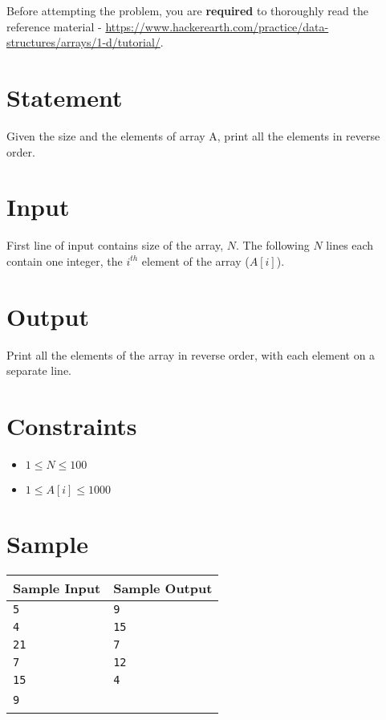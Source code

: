 \documentclass{article}
\begin{document}
Before attempting the problem, you are \textbf{required} to thoroughly read the reference material - \url{https://www.hackerearth.com/practice/data-structures/arrays/1-d/tutorial/}.

\section*{Statement}

Given the size and the elements of array A, print all the elements in reverse order.

\section*{Input}

First line of input contains size of the array, $N$. The following $N$ lines each contain one integer, the $i^{th}$ element of the array ($A[i]$).

\section*{Output}

Print all the elements of the array in reverse order, with each element on a separate line.

\section*{Constraints}

\begin{itemize}
    \item $1 \le N \le 100$
    \item $1 \le A[i] \le 1000$
\end{itemize}

\section*{Sample}

\begin{tabular}{l | l}
    \hline
    \hline
    Sample Input & Sample Output \\
    \hline
    \verb+5+ & \verb+9+ \\
    \verb+4+ & \verb+15+ \\
    \verb+21+ & \verb+7+ \\
    \verb+7+ & \verb+12+ \\
    \verb+15+ & \verb+4+ \\
    \verb+9+ & \ \\
    \hline
\end{tabular}
\end{document}
